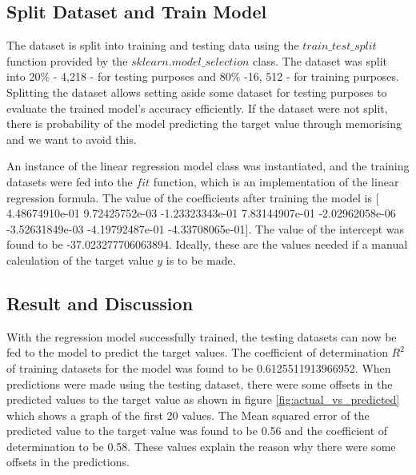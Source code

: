 \documentclass[conference]{IEEEtran}
\begin{document}
\subsection{Split Dataset and Train Model}
The dataset is split into training and testing data using the $train\_test\_split$ function provided by the $sklearn.model\_selection$ class. The dataset was split into 20\% - 4,218 - for testing purposes and 80\% -16, 512 - for training purposes. Splitting the dataset allows setting aside some dataset for testing purposes to evaluate the trained model's accuracy efficiently. If the dataset were not split, there is probability of the model predicting the target value through memorising and we want to avoid this. 

An instance of the linear regression model class was instantiated, and the training datasets were fed into the $fit$ function, which is an implementation of the linear regression formula. The value of the coefficients after training the model is [ 4.48674910e-01 9.72425752e-03 -1.23323343e-01 7.83144907e-01
 -2.02962058e-06 -3.52631849e-03 -4.19792487e-01 -4.33708065e-01]. The value of the intercept was found to be -37.023277706063894. Ideally, these are the values needed if a manual calculation of the target value $y$ is to be made. 

\subsection{Result and Discussion}
With the regression model successfully trained, the testing datasets can now be fed to the model to predict the target values. The coefficient of determination $R^2$ of training datasets for the model was found to be 0.6125511913966952.
When predictions were made using the testing dataset, there were some offsets in the predicted values to the target value as shown in figure \ref{fig:actual_vs_predicted} which shows a graph of the first 20 values. The Mean squared error of the predicted value to the target value was found to be 0.56 and the coefficient of determination to be 0.58. These values explain the reason why there were some offsets in the predictions.
\end{document}
